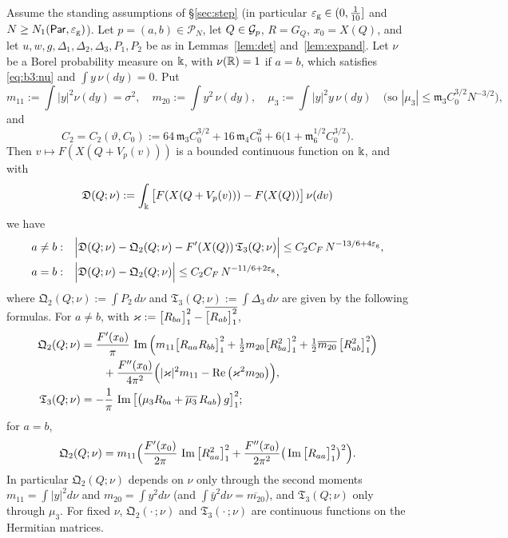 \begin{corollary}\label{cor:entry}
Assume the standing assumptions of \S\ref{sec:step} \textup{(}in particular $\varepsilon_{\mathrm g}\in(0,\frac1{10}]$ and $N\ge N_1(\mathsf{Par},\varepsilon_{\mathrm g})$\textup{)}.
Let $p=(a,b)\in\mathcal P_N$, let $Q\in\mathcal{G}_p$, $R=G_Q$, $x_0=X(Q)$, and let $u,w,g,\Delta_1,\Delta_2,\Delta_3,P_1,P_2$ be as in Lemmas~\ref{lem:det} and~\ref{lem:expand}.
Let $\nu$ be a Borel probability measure on $\Bbbk$, with $\nu(\mathbb{R})=1$ if $a=b$, which satisfies \eqref{eq:b3:nu} and $\int y\,\nu(dy)=0$. Put
\[
m_{11}:=\int|y|^2\nu(dy)=\sigma^2,\quad m_{20}:=\int y^2\,\nu(dy),\quad\mu_3:=\int|y|^2y\,\nu(dy)\quad\big(\text{so }|\mu_3|\le\mathfrak m_3C_0^{3/2}N^{-3/2}\big),
\]
and
\begin{equation}\label{eq:b3:C2}
C_2=C_2(\vartheta,C_0):=64\,\mathfrak m_3C_0^{3/2}+16\,\mathfrak m_4C_0^{2}+6\big(1+\mathfrak m_6^{1/2}C_0^{3/2}\big).
\end{equation}
Then $v\mapsto F(X(Q+V_p(v)))$ is a bounded continuous function on $\Bbbk$, and with
\[
\mathfrak D(Q;\nu):=\int_\Bbbk\big[F(X(Q+V_p(v)))-F(X(Q))\big]\,\nu(dv)
\]
we have
\begin{align}
a\ne b:\quad&\Big|\mathfrak D(Q;\nu)-\mathfrak Q_2(Q;\nu)-F'(X(Q))\,\mathfrak T_3(Q;\nu)\Big|\le C_2C_F\,N^{-13/6+4\varepsilon_{\mathrm g}},\label{eq:b3:entry}\\
a=b:\quad&\Big|\mathfrak D(Q;\nu)-\mathfrak Q_2(Q;\nu)\Big|\le C_2C_F\,N^{-11/6+2\varepsilon_{\mathrm g}},\label{eq:b3:entryd}
\end{align}
where $\mathfrak Q_2(Q;\nu):=\int P_2\,d\nu$ and $\mathfrak T_3(Q;\nu):=\int\Delta_3\,d\nu$ are given by the following formulas. For $a\ne b$, with
$\varkappa:=\big[R_{ba}\big]_{1}^{2}-\overline{\big[R_{ab}\big]_{1}^{2}}$,
\begin{align}
\mathfrak Q_2(Q;\nu)&=\frac{F'(x_0)}\pi\,\operatorname{Im}\Big(m_{11}\big[R_{aa}R_{bb}\big]_{1}^{2}+\tfrac12m_{20}\big[R_{ba}^2\big]_{1}^{2}+\tfrac12\overline{m_{20}}\,\big[R_{ab}^2\big]_{1}^{2}\Big)\notag\\
&\qquad+\frac{F''(x_0)}{4\pi^2}\Big(|\varkappa|^2m_{11}-\operatorname{Re}\big(\varkappa^2m_{20}\big)\Big),\label{eq:b3:Q2}\\
\mathfrak T_3(Q;\nu)&=-\frac1\pi\,\operatorname{Im}\big[\big(\mu_3R_{ba}+\overline{\mu_3}\,R_{ab}\big)\,g\big]_{1}^{2};\label{eq:b3:T3}
\end{align}
for $a=b$,
\begin{equation}\label{eq:b3:Q2d}
\mathfrak Q_2(Q;\nu)=m_{11}\Big(\frac{F'(x_0)}{2\pi}\,\operatorname{Im}\big[R_{aa}^2\big]_{1}^{2}+\frac{F''(x_0)}{2\pi^2}\big(\operatorname{Im}\big[R_{aa}\big]_{1}^{2}\big)^2\Big).
\end{equation}
In particular $\mathfrak Q_2(Q;\nu)$ depends on $\nu$ only through the second moments $m_{11}=\int|y|^2d\nu$ and $m_{20}=\int y^2d\nu$ \textup{(}and $\int\bar y^2d\nu=\overline{m_{20}}$\textup{)},
and $\mathfrak T_3(Q;\nu)$ only through $\mu_3$. For fixed $\nu$, $\mathfrak Q_2(\cdot\,;\nu)$ and $\mathfrak T_3(\cdot\,;\nu)$ are continuous functions on the Hermitian matrices.
\end{corollary}

